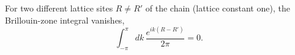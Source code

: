 \documentclass{article}
\begin{document}
For two different lattice sites $R \neq R'$ of the chain (lattice constant one), the Brillouin-zone integral vanishes,
\begin{equation}
\int_{-\pi}^{\pi} dk\, \frac{e^{i k (R-R')}}{2\pi} = 0 .
\label{eq:bz}
\end{equation}
\end{document}
